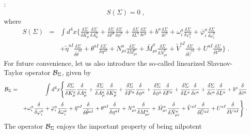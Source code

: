 \begin{appendix}
:
\begin{equation} 
S(\Sigma) = 0  \;, \label{st}
\end{equation} 
where 
\begin{eqnarray}
S(\Sigma) &=& \int d^{4}x \Biggl\{
\frac{\delta \Sigma}{\delta K^{a}_{\mu}}\frac{\delta \Sigma}{\delta A^{a}_{\mu}}
+ \frac{\delta \Sigma}{\delta F^{a}}\frac{\delta \Sigma}{\delta \phi^{a}}
+ \frac{\delta \Sigma}{\delta L^{a}}\frac{\delta \Sigma}{\delta c^{a}}
+ b^{a}\frac{\delta \Sigma}{\delta \bar{c}^{a}}
+ \omega^{a}_{i}\frac{\delta \Sigma}{\delta \varphi^{a}_{i}}
+ \bar{\varphi}^{a}_{i}\frac{\delta \Sigma}{\delta \bar{\omega}^{a}_{i}}
\nonumber \\
&&
+ \tilde{\eta}^{aI}\frac{\delta \Sigma}{\delta \tilde{\theta}^{aI}}
+ \theta^{aI}\frac{\delta \Sigma}{\delta \eta^{aI}}
+ N^{a}_{\mu i}\frac{\delta \Sigma}{\delta M^{a}_{\mu i}}
+ \bar{M}^{a}_{\mu i}\frac{\delta \Sigma}{\delta \bar{N}^{a}_{\mu i}}
+ \tilde{V}^{aI}\frac{\delta \Sigma}{\delta \tilde{U}^{aI}}
+ U^{aI}\frac{\delta \Sigma}{\delta V^{aI}}
\Biggr\}  \;.     \label{stop}
\end{eqnarray}
For future convenience, let us also introduce the so-called linearized Slavnov-Taylor operator ${\cal B}_{\Sigma}$, given by 
\begin{eqnarray}
{\cal B}_{\Sigma} &=& \int d^{4}x \Biggl\{
\frac{\delta \Sigma}{\delta K^{a}_{\mu}}\frac{\delta }{\delta A^{a}_{\mu}}
+ \frac{\delta \Sigma}{\delta A^{a}_{\mu}}\frac{\delta }{\delta K^{a}_{\mu}}
+ \frac{\delta \Sigma}{\delta F^{a}}\frac{\delta }{\delta \phi^{a}}
+ \frac{\delta \Sigma}{\delta \phi^{a}}\frac{\delta }{\delta F^{a}}
+ \frac{\delta \Sigma}{\delta L^{a}}\frac{\delta }{\delta c^{a}}
+ \frac{\delta \Sigma}{\delta c^{a}}\frac{\delta }{\delta L^{a}}
+ b^{a}\frac{\delta }{\delta \bar{c}^{a}}
\nonumber \\
&&
+ \omega^{a}_{i}\frac{\delta }{\delta \varphi^{a}_{i}}
+ \bar{\varphi}^{a}_{i}\frac{\delta }{\delta \bar{\omega}^{a}_{i}}
+ \tilde{\eta}^{aI}\frac{\delta }{\delta \tilde{\theta}^{aI}}
+ \theta^{aI}\frac{\delta }{\delta \eta^{aI}}
+ N^{a}_{\mu i}\frac{\delta }{\delta M^{a}_{\mu i}}
+ \bar{M}^{a}_{\mu i}\frac{\delta }{\delta \bar{N}^{a}_{\mu i}}
+ \tilde{V}^{aI}\frac{\delta }{\delta \tilde{U}^{aI}}
+ U^{aI}\frac{\delta }{\delta V^{aI}}
\Biggr\}\;.  \nonumber \\    \label{lst}
\end{eqnarray}
The operator ${\cal B}_{\Sigma}$ enjoys the important property of being nilpotent
\begin{equation}

\end{equation}
\end{appendix}
